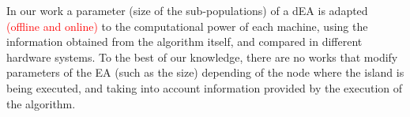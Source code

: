 \documentclass[final,1p,times]{elsarticle}
\begin{document}
In our work a parameter (size of the sub-populations) of a dEA is adapted \textcolor{red}{(offline and online)} to the computational power of each machine, using the information obtained from the algorithm itself, and compared in different hardware systems.
 To the best of our knowledge, there are no works that
 modify parameters of the EA (such as the size) depending of the
 node where the island is being executed, and taking into account information provided by the execution of the algorithm. 






\end{document}

